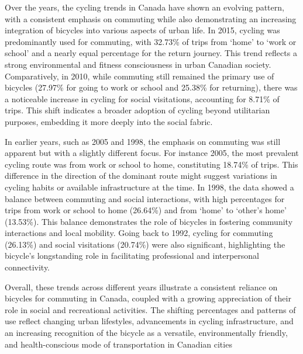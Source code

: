 \documentclass[12pt,twoside]{reedthesis}
\begin{document}
Over the years, the cycling trends in Canada have shown an evolving pattern, with a consistent emphasis on commuting while also demonstrating an increasing integration of bicycles into various aspects of urban life. In 2015, cycling was predominantly used for commuting, with 32.73\% of trips from `home' to `work or school' and a nearly equal percentage for the return journey. This trend reflects a strong environmental and fitness consciousness in urban Canadian society. Comparatively, in 2010, while commuting still remained the primary use of bicycles (27.97\% for going to work or school and 25.38\% for returning), there was a noticeable increase in cycling for social visitations, accounting for 8.71\% of trips. This shift indicates a broader adoption of cycling beyond utilitarian purposes, embedding it more deeply into the social fabric.

In earlier years, such as 2005 and 1998, the emphasis on commuting was still apparent but with a slightly different focus. For instance 2005, the most prevalent cycling route was from work or school to home, constituting 18.74\% of trips. This difference in the direction of the dominant route might suggest variations in cycling habits or available infrastructure at the time. In 1998, the data showed a balance between commuting and social interactions, with high percentages for trips from work or school to home (26.64\%) and from `home' to `other's home' (13.53\%). This balance demonstrates the role of bicycles in fostering community interactions and local mobility. Going back to 1992, cycling for commuting (26.13\%) and social visitations (20.74\%) were also significant, highlighting the bicycle's longstanding role in facilitating professional and interpersonal connectivity.

Overall, these trends across different years illustrate a consistent reliance on bicycles for commuting in Canada, coupled with a growing appreciation of their role in social and recreational activities. The shifting percentages and patterns of use reflect changing urban lifestyles, advancements in cycling infrastructure, and an increasing recognition of the bicycle as a versatile, environmentally friendly, and health-conscious mode of transportation in Canadian cities
\end{document}
